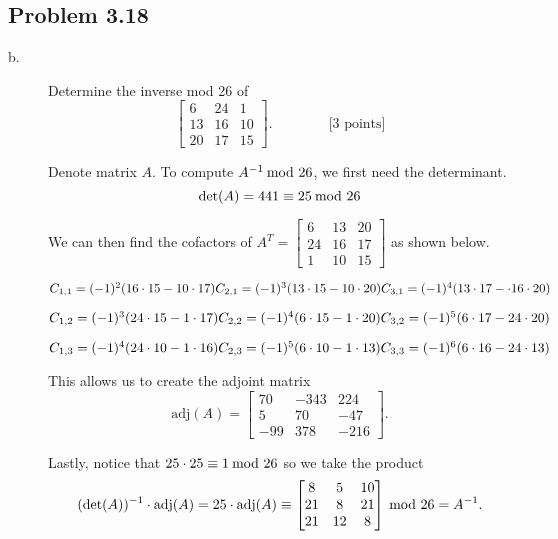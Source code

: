 \documentclass[../hw_sols.tex]{subfiles}
\begin{document}
\subsection*{Problem 3.18}

\begin{description}

\item[b.] Determine the inverse mod 26 of
	$$\begin{bmatrix}
		6  & 24 &  1 \\ 
		13 & 16 & 10 \\ 
		20 & 17 & 15
	\end{bmatrix}
	. \qquad\qquad \text{[3 points]}$$

\begin{solution}

Denote matrix $A$. To compute $A^{-1} \tmod{26}$, we first need the 
determinant.
	$$\det(A) = 441 \equiv 25 \tmod{26}$$

We can then find the cofactors of 
	$A^T = 
	\begin{bmatrix}
		 6 & 13 & 20 \\ 
		24 & 16 & 17 \\ 
		 1 & 10 & 15
	\end{bmatrix}$
as shown below.
	
\begin{multicols}{3}
	$C_{1,1} = (-1)^2(16 \cdot 15 - 10 \cdot 17) \\
	C_{2,1} = (-1)^3(13 \cdot 15 - 10 \cdot 20)  \\
	C_{3,1} = (-1)^4(13 \cdot 17 - \cdot 16 \cdot 20)$
	
	$C_{1,2} = (-1)^3(24 \cdot 15 - 1 \cdot 17) \\
	C_{2,2} = (-1)^4(6 \cdot 15 - 1 \cdot 20)   \\
	C_{3,2} = (-1)^5(6 \cdot 17 - 24 \cdot 20)$
	
	$C_{1,3} = (-1)^4(24 \cdot 10 - 1 \cdot 16) \\
	C_{2,3} = (-1)^5(6 \cdot 10 - 1 \cdot 13)   \\
	C_{3,3} = (-1)^6(6 \cdot 16 - 24 \cdot 13)$
\end{multicols}

This allows us to create the adjoint matrix
	$$\text{adj}(A) =
	\begin{bmatrix}
		 70 & -343 &  224 \\ 
		  5 &   70 &  -47 \\ 
		-99 &  378 & -216
	\end{bmatrix}.$$

Lastly, notice that $25 \cdot 25 \equiv 1 \tmod{26}$ so we take the product
	$$(\det(A))^{-1} \cdot \text{adj}(A) 
	= 25 \cdot \text{adj}(A) 
	\equiv 
	\begin{bmatrix}
		 8 &  5 & 10 \\ 
		21 &  8 & 21 \\ 
		21 & 12 & 8
	\end{bmatrix} 
	\tmod{26} = A^{-1}.$$

\end{solution}

\end{description}
\end{document}
